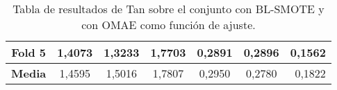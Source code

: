 \begin{table}[H]
{\begin{tabular}{|crrrrrr|}
\multicolumn{1}{|c|}{\textbf{Fold 5}} & \multicolumn{1}{c|}{1,4073}            & \multicolumn{1}{c|}{1,3233}              & \multicolumn{1}{c|}{1,7703}          & \multicolumn{1}{c|}{0,2891}            & \multicolumn{1}{c|}{0,2896}              & 0,1562                             \\ \hline
\multicolumn{1}{|c|}{\textbf{Media}}  & \multicolumn{1}{c|}{1,4595}           & \multicolumn{1}{c|}{1,5016}             & \multicolumn{1}{c|}{1,7807}         & \multicolumn{1}{c|}{0,2950}           & \multicolumn{1}{c|}{0,2780}             & 0,1822                            \\ \hline
\end{tabular}%
}
\caption{Tabla de resultados de Tan sobre el conjunto con BL-SMOTE y con OMAE como función de ajuste.}\label{tablaTANconBLSMOTEconOMAE}

\end{table}


